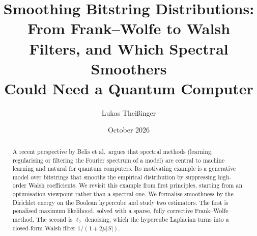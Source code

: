 \documentclass[11pt]{article}
\title{Smoothing Bitstring Distributions:\\
From Frank--Wolfe to Walsh Filters, and Which Spectral Smoothers\\ Could Need a Quantum Computer}
\author{Lukas Thei{\ss}inger}
\date{October 2026}
\theoremstyle{definition}
\theoremstyle{remark}
\begin{document}
\maketitle

\begin{abstract}
A recent perspective by Belis et al.\ argues that spectral methods (learning, regularising or filtering the Fourier spectrum of a model) are central to machine learning and natural for quantum computers. Its motivating example is a generative model over bitstrings that smooths the empirical distribution by suppressing high-order Walsh coefficients. We revisit this example from first principles, starting from an optimisation viewpoint rather than a spectral one. We formalise smoothness by the Dirichlet energy on the Boolean hypercube and study two estimators. The first is penalised maximum likelihood, solved with a sparse, fully corrective Frank--Wolfe method. The second is $\ell_2$ denoising, which the hypercube Laplacian turns into a closed-form Walsh filter $1/(1+2\mu|S|)$.


\end{abstract}
\end{document}
